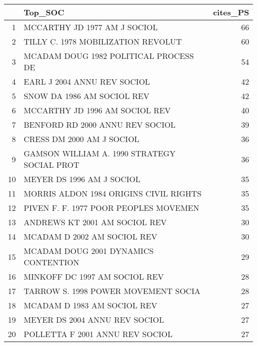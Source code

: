 \begin{table}[ht]
\centering
\begin{tabular}{rlr}
  \hline
 & Top\_SOC & cites\_PS \\ 
  \hline
1 & MCCARTHY JD 1977 AM J SOCIOL  & 66 \\ 
  2 & TILLY C. 1978 MOBILIZATION REVOLUT & 60 \\ 
  3 & MCADAM DOUG 1982 POLITICAL PROCESS DE & 54 \\ 
  4 & EARL J 2004 ANNU REV SOCIOL  & 42 \\ 
  5 & SNOW DA 1986 AM SOCIOL REV  & 42 \\ 
  6 & MCCARTHY JD 1996 AM SOCIOL REV  & 40 \\ 
  7 & BENFORD RD 2000 ANNU REV SOCIOL  & 39 \\ 
  8 & CRESS DM 2000 AM J SOCIOL  & 36 \\ 
  9 & GAMSON WILLIAM A. 1990 STRATEGY SOCIAL PROT & 36 \\ 
  10 & MEYER DS 1996 AM J SOCIOL  & 35 \\ 
  11 & MORRIS ALDON 1984 ORIGINS CIVIL RIGHTS & 35 \\ 
  12 & PIVEN F. F. 1977 POOR PEOPLES MOVEMEN & 35 \\ 
  13 & ANDREWS KT 2001 AM SOCIOL REV  & 30 \\ 
  14 & MCADAM D 2002 AM SOCIOL REV  & 30 \\ 
  15 & MCADAM DOUG 2001 DYNAMICS CONTENTION & 29 \\ 
  16 & MINKOFF DC 1997 AM SOCIOL REV  & 28 \\ 
  17 & TARROW S. 1998 POWER MOVEMENT SOCIA & 28 \\ 
  18 & MCADAM D 1983 AM SOCIOL REV  & 27 \\ 
  19 & MEYER DS 2004 ANNU REV SOCIOL  & 27 \\ 
  20 & POLLETTA F 2001 ANNU REV SOCIOL  & 27 \\ 
   \hline
\end{tabular}
\end{table}
